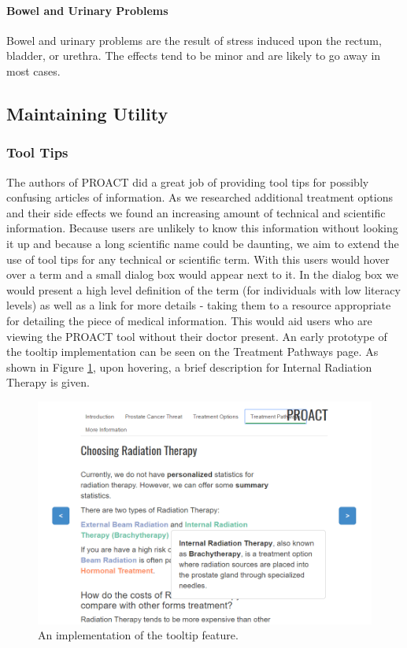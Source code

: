 \documentclass[journal]{vgtc}                %
\begin{document}
                        \paragraph{Bowel and Urinary Problems}
                                Bowel and urinary problems are the result of stress induced upon the rectum, bladder, or urethra.
                                The effects tend to be minor and are likely to go away in most cases.


        \subsection{Maintaining Utility}
                \subsubsection{Tool Tips}
                        The authors of PROACT did a great job of providing tool tips for possibly confusing articles of information.
                        As we researched additional treatment options and their side effects we found an increasing amount of technical and scientific information.
                        Because users are unlikely to know this information without looking it up and because a long scientific name could be daunting, we aim to extend the use of tool tips for any technical or scientific term.
                        With this users would hover over a term and a small dialog box would appear next to it.
                        In the dialog box we would present a high level definition of the term (for individuals with low literacy levels) as well as a link for more details - taking them to a resource appropriate for detailing the piece of medical information.
                        This would aid users who are viewing the PROACT tool without their doctor present.
                        An early prototype of the tooltip implementation can be seen on the Treatment Pathways page. As shown in Figure \ref{fig:tool}, upon hovering, a brief description for Internal Radiation Therapy is given.
                        \begin{figure}[!ht]
                            \includegraphics[width=\columnwidth]{tooltip.png}
                            \caption{An implementation of the tooltip feature.}
                            \label{fig:tool}
                        \end{figure}
\end{document}
